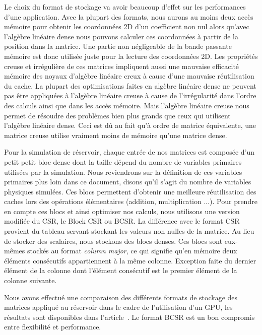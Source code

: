 Le choix du format de stockage va avoir beaucoup d'effet sur les performances d'une application.
%
Avec la plupart des formats, nous aurons au moins deux accès mémoire pour obtenir les coordonnées 2D d'un coefficient non nul alors qu'avec l'algèbre linéaire dense nous pouvons calculer ces coordonnées à partir de la position dans la matrice.
%
Une partie non négligeable de la bande passante mémoire est donc utilisée juste pour la lecture des coordonnées 2D.
%
Les propriétés creuse et irrégulière de ces matrices impliquent aussi une mauvaise efficacité mémoire des noyaux d'algèbre linéaire creux à cause d'une mauvaise réutilisation du cache.
%
La plupart des optimisations faites en algèbre linéaire dense ne peuvent pas être appliquées à l'algèbre linéaire creuse à cause de l'irrégularité dans l'ordre des calculs ainsi que dans les accès mémoire.
%
Mais l'algèbre linéaire creuse nous permet de résoudre des problèmes bien plus grands que ceux qui utilisent l'algèbre linéaire dense.
%
Ceci est dû au fait qu'à ordre de matrice équivalente, une matrice creuse utilise vraiment moins de mémoire qu'une matrice dense.


Pour la simulation de réservoir, chaque entrée de nos matrices est composée d'un petit petit bloc dense dont la taille dépend du nombre de variables primaires utilisées par la simulation.
%
Nous reviendrons sur la définition de ces variables primaires plus loin dans ce document, disons qu'il s'agit du nombre de variables physiques simulées.
%
Ces blocs permettent d'obtenir une meilleure réutilisation des caches lors des opérations élémentaires (addition, multiplication ...).
%
Pour prendre en compte ces blocs et ainsi optimiser nos calculs, nous utilisons une version modifiée du CSR, le Block CSR ou BCSR.
%
La différence avec le format CSR provient du tableau servant stockant les valeurs non nulles de la matrice.
%
Au lieu de stocker des scalaires, nous stockons des blocs denses.
%
Ces blocs sont eux-mêmes stockés au format {\em column major}, ce qui signifie qu'en mémoire deux éléments consécutifs appartiennent à la même colonne.
%
Exception faite du dernier élément de la colonne dont l'élément consécutif est le premier élément de la colonne suivante.


Nous avons effectué une comparaison des différents formats de stockage des matrices appliqué au réservoir dans le cadre de l'utilisation d'un GPU, les résultats sont disponibles dans l'article~\cite{Renpar}.
%
Le format BCSR est un bon compromis entre flexibilité et performance.


